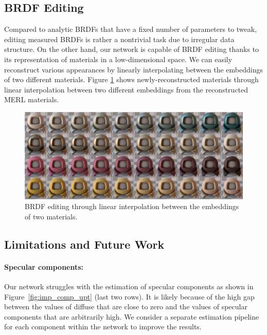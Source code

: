 \subsection{BRDF Editing}

Compared to analytic BRDFs that have a fixed number of parameters to tweak, editing measured BRDFs is rather a nontrivial task due to irregular data structure. On the other hand, our network is capable of BRDF editing thanks to its representation of materials in a low-dimensional space. We can easily reconstruct various appearances by linearly interpolating between the embeddings of two different materials. Figure \ref{fig:interpolation} shows newly-reconstructed materials through linear interpolation between two different embeddings from the reconstructed MERL materials. 


\begin{figure}[ht]
  \centering
   \includegraphics[width=0.9\linewidth]{Chapters/hyperbrdf-figs/interpolation_extended.pdf}

   \caption{BRDF editing through linear interpolation between the embeddings of two materials.}
   \label{fig:interpolation}
\end{figure}


\subsection{Limitations and Future Work}\label{sec:limits}
\paragraph{Specular components:} Our network struggles with the estimation of specular components as shown in Figure~\ref{fig:imp_comp_upt} (last two rows). It is likely because of the high gap between the values of diffuse that are close to zero and the values of specular components that are arbitrarily high. We consider a separate estimation pipeline for each component within the network to improve the results.


